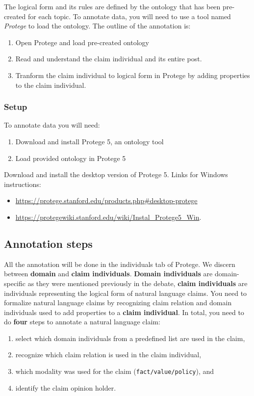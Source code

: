 \noindent The logical form and its rules are defined by the ontology that has been
pre-created for each topic. To annotate data, you will need to use a tool named
\textit{Protege} to load the ontology. 
The outline of the annotation is: 
\begin{enumerate}
\item Open Protege and load pre-created ontology
\item Read and understand the claim individual and its entire post.  
\item Tranform the claim individual to logical form in Protege by adding properties to the claim
individual. 
\end{enumerate}

\subsubsection{Setup}

To annotate data you will need:
\begin{enumerate}
\item Download and install Protege 5, an ontology tool
\item Load provided ontology in Protege 5
\end{enumerate}
Download and install the desktop version of Protege 5. Links for Windows instructions:
\begin{itemize}
\item \url{https://protege.stanford.edu/products.php#desktop-protege}
\item \url{https://protegewiki.stanford.edu/wiki/Instal_Protege5_Win}.
\end{itemize}

\subsection{Annotation steps}

All the annotation will be done in the individuals tab of Protege. 
We discern between \textbf{domain} and \textbf{claim individuals}. 
\textbf{Domain individuals} are domain-specific as they
were mentioned previously in the debate, \textbf{claim individuals} are individuals
representing the logical form of natural language claims. 
You need to formalize natural language claims 
by recognizing claim relation and domain individuals
used to add properties to a \textbf{claim individual}. In total, you need to do \textbf{four}
steps to annotate a natural language claim:
\begin{enumerate}[label=\textbf{Step \arabic*.}, leftmargin=2cm]
\item select which domain individuals from a predefined list are used in the claim,
\item recognize which claim relation is used in the claim individual, 
\item which modality was used for the claim (\texttt{fact/value/policy}), and 
\item identify the claim opinion holder. 
\end{enumerate}


